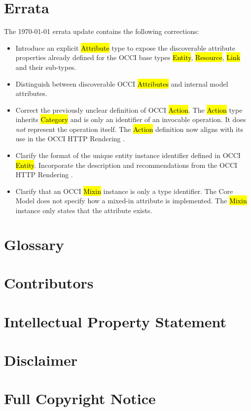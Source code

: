 \documentclass[10pt,a4paper]{article}
\begin{document}
\section{Errata}

The {\today} errata update contains the following corrections:
\begin{itemize}
\item Introduce an explicit \hl{Attribute} type to expose the discoverable
  attribute properties already defined for the OCCI base types \hl{Entity},
  \hl{Resource}, \hl{Link} and their sub-types.

\item Distinguish between discoverable OCCI \hl{Attributes} and internal model
  attributes.

\item Correct the previously unclear definition of OCCI \hl{Action}. The
  \hl{Action} type inherits \hl{Category} and is only an identifier of
  an invocable operation. It does {\em not} represent the operation itself.
  The \hl{Action} definition now aligns with its use in the OCCI HTTP Rendering
  \cite{occi:http_rendering}.

\item Clarify the format of the unique entity instance identifier defined in
  OCCI \hl{Entity}. Incorporate the description and recommendations from the
  OCCI HTTP Rendering \cite{occi:http_rendering}.

\item Clarify that an OCCI \hl{Mixin} instance is only a type identifier. The
  Core Model does not specify how a mixed-in attribute is implemented. The
  \hl{Mixin} instance only states that the attribute exists.
\end{itemize}


\section{Glossary}
\label{sec:glossary}


\section{Contributors}


\section{Intellectual Property Statement}


\section{Disclaimer}


\section{Full Copyright Notice}




\end{document}
